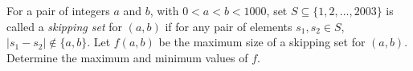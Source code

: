 For a pair of integers $a$ and $b$, with $0 < a < b < 1000$, set $S\subseteq \{ 1, 2, \dots , 2003\}$ is called a \emph{skipping set} for $(a, b)$ if for any pair of elements $s_1, s_2 \in S$, $|s_1 - s_2|\not\in \{ a, b\}$. Let $f(a, b)$ be the maximum size of a skipping set for $(a, b)$. Determine the maximum and minimum values of $f$.